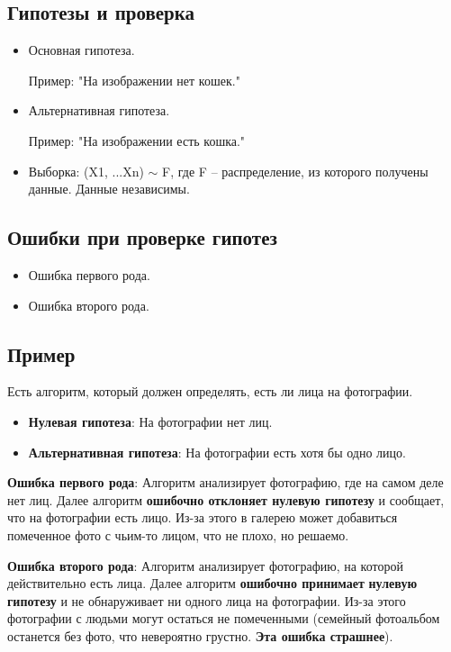 \newpage

\subsection{Гипотезы и проверка}
\begin{itemize}
    \item Основная гипотеза.

          Пример: "На изображении нет кошек."

    \item Альтернативная гипотеза.

          Пример: "На изображении есть кошка."

    \item Выборка: (X1, ...Xn) \(\sim\) F, где F – распределение, из которого получены данные. Данные независимы.
\end{itemize}
\subsection*{Ошибки при проверке гипотез}
\begin{itemize}
    \item Ошибка первого рода.
    \item Ошибка второго рода.
\end{itemize}
\subsection*{Пример}
Есть алгоритм, который должен определять, есть ли лица на фотографии.
\begin{itemize}
    \item \textbf{Нулевая гипотеза}: На фотографии нет лиц.
    \item \textbf{Альтернативная гипотеза}: На фотографии есть хотя бы одно лицо.
\end{itemize}

\*

\textbf{Ошибка первого рода}: Алгоритм анализирует фотографию, где на
самом деле нет лиц. Далее алгоритм \textbf{ошибочно отклоняет нулевую гипотезу} и сообщает, что на фотографии есть лицо. Из-за этого в галерею может добавиться помеченное фото с чьим-то лицом, что не плохо, но решаемо.

\*

\textbf{Ошибка второго рода}: Алгоритм анализирует фотографию, на которой действительно есть лица. Далее алгоритм \textbf{ошибочно принимает} \textbf{нулевую гипотезу} и не обнаруживает ни одного лица на фотографии. Из-за этого фотографии с людьми могут остаться не помеченными (семейный фотоальбом останется без фото, что невероятно грустно. \textbf{Эта ошибка страшнее}).